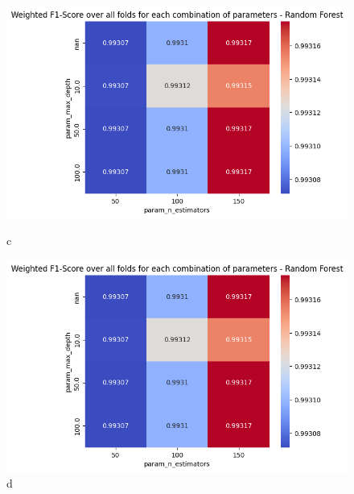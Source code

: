 \begin{figure}[H]
            \vspace{0.5cm}  %
            
            \begin{minipage}{\textwidth}
                \begin{minipage}[t]{0.48\textwidth}
                    \centering
                    \includegraphics[width=\textwidth]{../figures/plots/section2/weighted_f1_score_for_each_combination_of_parameters_random_forest.png}
                    \caption{c}
                    \label{fig:c}
                \end{minipage}%
                \hfill%
                \begin{minipage}[t]{0.48\textwidth}
                    \centering
                    \includegraphics[width=\textwidth]{../figures/plots/section2/weighted_f1_score_for_each_combination_of_parameters_random_forest.png}
                    \caption{d}
                    \label{fig:d}
                \end{minipage}
            \end{minipage}
            

\end{figure}
